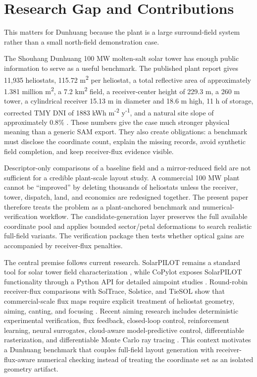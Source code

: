 \documentclass[final,3p,times]{elsarticle}
\begin{document}
\section{Research Gap and Contributions}
This matters for Dunhuang because the plant is a large surround-field system rather than a small north-field demonstration case.

The Shouhang Dunhuang 100 MW molten-salt solar tower has enough public information to serve as a useful benchmark. The published plant report gives 11,935 heliostats, 115.72 m\textsuperscript{2} per heliostat, a total reflective area of approximately 1.381 million m\textsuperscript{2}, a 7.2 km\textsuperscript{2} field, a receiver-center height of 229.3 m, a 260 m tower, a cylindrical receiver 15.13 m in diameter and 18.6 m high, 11 h of storage, corrected TMY DNI of 1883 kWh m\textsuperscript{-2} y\textsuperscript{-1}, and a natural site slope of approximately 0.8\% \cite{huang2024dunhuang}. These numbers give the case much stronger physical meaning than a generic SAM export. They also create obligations: a benchmark must disclose the coordinate count, explain the missing records, avoid synthetic field completion, and keep receiver-flux evidence visible.

Descriptor-only comparisons of a baseline field and a mirror-reduced field are not sufficient for a credible plant-scale layout study. A commercial 100 MW plant cannot be ``improved'' by deleting thousands of heliostats unless the receiver, tower, dispatch, land, and economics are redesigned together. The present paper therefore treats the problem as a plant-anchored benchmark and numerical-verification workflow. The candidate-generation layer preserves the full available coordinate pool and applies bounded sector/petal deformations to search realistic full-field variants. The verification package then tests whether optical gains are accompanied by receiver-flux penalties.

The central premise follows current research. SolarPILOT remains a standard tool for solar tower field characterization \cite{wagner2018solarpilot,nrel2025solarpilotdocs}, while CoPylot exposes SolarPILOT functionality through a Python API for detailed aimpoint studies \cite{hamilton2022copilot}. Round-robin receiver-flux comparisons with SolTrace, Solstice, and TieSOL show that commercial-scale flux maps require explicit treatment of heliostat geometry, aiming, canting, and focusing \cite{mitchell2025roundrobin}. Recent aiming research includes deterministic experimental verification, flux feedback, closed-loop control, reinforcement learning, neural surrogates, cloud-aware model-predictive control, differentiable rasterization, and differentiable Monte Carlo ray tracing \cite{sanchez2024experimental,acosta2021fluxfeedback,oberkirsch2023closedloop,cruz2022rl,carballo2025rl,alcantara2025nn,wu2026mlmpc,zheng2025diffneg,lin2025dmcrt}. This context motivates a Dunhuang benchmark that couples full-field layout generation with receiver-flux-aware numerical checking instead of treating the coordinate set as an isolated geometry artifact.
\end{document}
